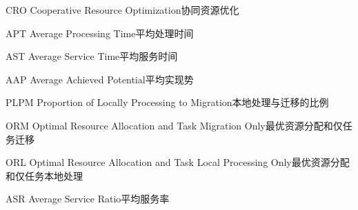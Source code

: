 \begin{abbreviate}[0mm][18mm]
\item[CRO] Cooperative Resource Optimization\hspace{1em}协同资源优化
\item[APT] Average Processing Time\hspace{1em}平均处理时间
\item[AST] Average Service Time\hspace{1em}平均服务时间
\item[AAP] Average Achieved Potential\hspace{1em}平均实现势
\item[PLPM] Proportion of Locally Processing to Migration\hspace{1em}本地处理与迁移的比例
\item[ORM] Optimal Resource Allocation and Task Migration Only\hspace{1em}最优资源分配和仅任务迁移
\item[ORL] Optimal Resource Allocation and Task Local Processing Only\hspace{1em}最优资源分配和仅任务本地处理
\item[ASR] Average Service Ratio\hspace{1em}平均服务率
\end{abbreviate}
\endinput